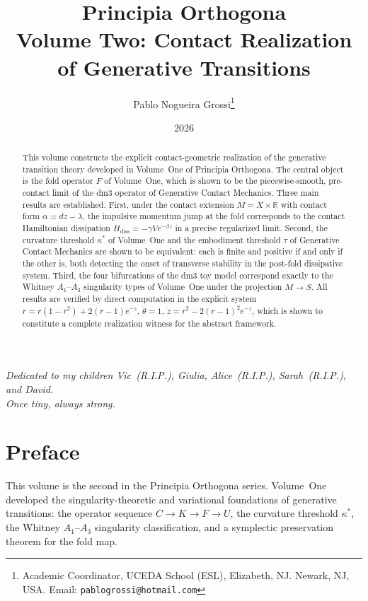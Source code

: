 \documentclass[12pt]{article}
\title{\textbf{Principia Orthogona}\\[0.5em]
\large Volume Two: Contact Realization of Generative Transitions}
\author{Pablo Nogueira Grossi\thanks{%
  Academic Coordinator, UCEDA School (ESL), Elizabeth, NJ\@.
  Newark, NJ, USA\@.
  Email: \texttt{pablogrossi@hotmail.com}}}
\date{2026}
\numberwithin{equation}{section}
\theoremstyle{remark}
\begin{document}
\begin{abstract}
This volume constructs the explicit contact-geometric realization
of the generative transition theory developed in Volume~One of
Principia Orthogona. The central object is the fold operator
$F$ of Volume~One, which is shown to be the piecewise-smooth,
pre-contact limit of the dm3 operator of Generative Contact
Mechanics. Three main results are established. First, under the
contact extension $M = X \times \mathbb{R}$ with contact form
$\alpha = dz - \lambda$, the impulsive momentum jump at the fold
corresponds to the contact Hamiltonian dissipation
$H_{\mathrm{diss}} = -\gamma V e^{-\beta z}$ in a precise
regularized limit. Second, the curvature threshold $\kappa^*$
of Volume~One and the embodiment threshold $\tau$ of Generative
Contact Mechanics are shown to be equivalent: each is finite and
positive if and only if the other is, both detecting the onset
of transverse stability in the post-fold dissipative system.
Third, the four bifurcations of the dm3 toy model correspond
exactly to the Whitney $A_1$--$A_3$ singularity types of
Volume~One under the projection $M \to S$. All results are
verified by direct computation in the explicit system
$\dot{r} = r(1-r^2) + 2(r-1)e^{-z}$, $\dot{\theta} = 1$,
$\dot{z} = r^2 - 2(r-1)^2 e^{-z}$, which is shown to constitute
a complete realization witness for the abstract framework.
\end{abstract}

\maketitle

\begin{center}
\emph{Dedicated to my children Vic~(R.I.P.), Giulia,
  Alice~(R.I.P.), Sarah~(R.I.P.), and David.}\\[4pt]
\emph{Once tiny, always strong.}
\end{center}

\vspace{1.5em}
\tableofcontents
\newpage

\section*{Preface}

This volume is the second in the Principia Orthogona series.
Volume~One~\cite{PO1} developed the singularity-theoretic and
variational foundations of generative transitions: the operator
sequence $C\to K\to F\to U$, the curvature threshold $\kappa^*$,
the Whitney $A_1$--$A_3$ singularity classification, and a
symplectic preservation theorem for the fold map.
\end{document}
